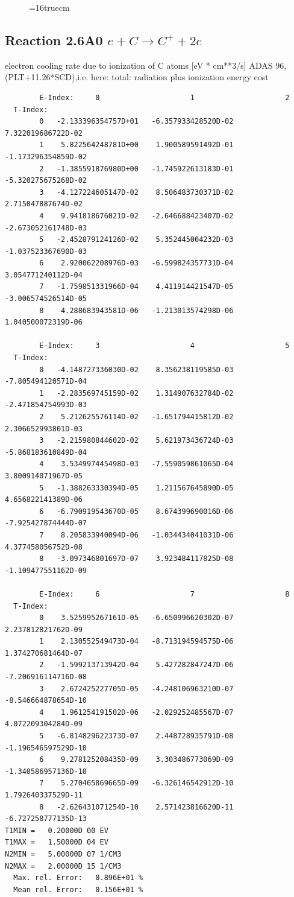\documentclass[12pt,dvipdfmx]{article}
\begin{document}
\begin{figure} \label{2.6il}
\epsfxsize=16truecm
\end{figure}
\newpage
\subsection{
  Reaction 2.6A0  $e + C  \rightarrow C^+   + 2e $
}
electron cooling rate due to ionization of C atoms [eV * cm**3/s]
ADAS 96, (PLT+11.26*SCD),i.e. here: total: radiation plus ionization energy cost

\begin{small}\begin{verbatim}
        E-Index:     0                     1                     2
  T-Index:
        0   -2.133396354757D+01   -6.357933428520D-02    7.322019686722D-02
        1    5.822564248781D+00    1.900589591492D-01   -1.173296354859D-02
        2   -1.385591876980D+00   -1.745922613183D-01   -5.320275675268D-02
        3   -4.127224605147D-02    8.506483730371D-02    2.715047887674D-02
        4    9.941818676021D-02   -2.646688423407D-02   -2.673052161748D-03
        5   -2.452879124126D-02    5.352445004232D-03   -1.037523367690D-03
        6    2.920062208976D-03   -6.599824357731D-04    3.054771240112D-04
        7   -1.759851331966D-04    4.411914421547D-05   -3.006574526514D-05
        8    4.288683943581D-06   -1.213013574298D-06    1.040500072319D-06

        E-Index:     3                     4                     5
  T-Index:
        0   -4.148727336030D-02    8.356238119585D-03   -7.805494120571D-04
        1   -2.283569745159D-02    1.314907632784D-02   -2.471854754993D-03
        2    5.212625576114D-02   -1.651794415812D-02    2.306652993801D-03
        3   -2.215980844602D-02    5.621973436724D-03   -5.868183610849D-04
        4    3.534997445498D-03   -7.559059861065D-04    3.800914071967D-05
        5   -1.388263330394D-05    1.211567645890D-05    4.656822141389D-06
        6   -6.790919543670D-05    8.674399690016D-06   -7.925427874444D-07
        7    8.205833940094D-06   -1.034434041031D-06    4.377458056752D-08
        8   -3.097346801697D-07    3.923484117825D-08   -1.109477551162D-09

        E-Index:     6                     7                     8
  T-Index:
        0    3.525995267161D-05   -6.650996620302D-07    2.237812821762D-09
        1    2.130552549473D-04   -8.713194594575D-06    1.374270681464D-07
        2   -1.599213713942D-04    5.427282847247D-06   -7.206916114716D-08
        3    2.672425227705D-05   -4.248106963210D-07   -8.546664878654D-10
        4    1.961254191502D-06   -2.029252485567D-07    4.072209304284D-09
        5   -6.814829622373D-07    2.448728935791D-08   -1.196546597529D-10
        6    9.278125208435D-09    3.303486773069D-09   -1.340586957136D-10
        7    5.270465869665D-09   -6.326146542912D-10    1.792640337529D-11
        8   -2.626431071254D-10    2.571423816620D-11   -6.727258777135D-13
T1MIN =   0.20000D 00 EV
T1MAX =   1.50000D 04 EV
N2MIN =   5.00000D 07 1/CM3
N2MAX =   2.00000D 15 1/CM3
  Max. rel. Error:   0.896E+01 %
  Mean rel. Error:   0.156E+01 %


\end{verbatim}
\end{small}
\end{document}

